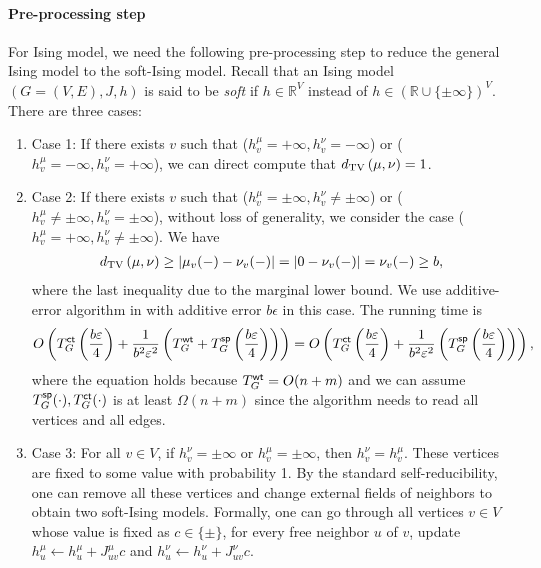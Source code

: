 \paragraph{Pre-processing step}
For Ising model, we need the following pre-processing step to reduce the general Ising model to the soft-Ising model.
Recall that an Ising model $(G=(V,E),J,h)$ is said to be \emph{soft} if $h \in \mathbb{R}^V$ instead of $h \in (\mathbb{R} \cup \{\pm \infty\})^V$. There are three cases: 
\begin{enumerate}
    \item Case 1: If there exists $v$ such that ($h_v^\mu =  +\infty,h_v^\nu = - \infty$)  or ($h_v^\mu = -\infty, h_v^\nu = +\infty$), we can direct compute that $d_{\mathrm{TV}}\left({\mu},{\nu}\right)=1$.
    \item Case 2: If there exists $v$ such that ($h_v^\mu =  \pm \infty,h_v^\nu \neq \pm \infty$) or ($h_v^\mu \neq \pm \infty, h_v^\nu = \pm \infty$), without loss of generality, we consider the case ($h_v^\mu =  +\infty,h_v^\nu \neq \pm \infty$). We have 
    \begin{align*}
        d_{\mathrm{TV}}\left({\mu},{\nu}\right)\geq |\mu_v(-)-\nu_v(-)|=|0-\nu_v(-)|=\nu_v(-) \geq b,
    \end{align*} 
    where the last inequality due to the marginal lower bound.
    We use additive-error algorithm in  with additive error $b\epsilon$ in this case. The running time is 
    \begin{align}\label{eq:time-pre}
        O\left(T^{\textsf{ct}}_G\left(\frac{b\varepsilon}{4}\right)+ \frac{1}{b^2\varepsilon^2}\left( T^{\textsf{wt}}_{G} + T^{\textsf{sp}}_G\left(\frac{b\varepsilon}{4}\right)\right)\right) =O\left(T^{\textsf{ct}}_G\left(\frac{b\varepsilon}{4}\right)+ \frac{1}{b^2\varepsilon^2}\left(T^{\textsf{sp}}_G\left(\frac{b\varepsilon}{4}\right)\right)\right),
    \end{align}
    where the equation holds because $T^{\textsf{wt}}_{G} = O(n+m)$ and we can assume $T^{\textsf{sp}}_G(\cdot),T^{\textsf{ct}}_G(\cdot)$ is at least $\Omega(n+m)$ since the algorithm needs to read all vertices and all edges.
    
    \item Case 3: For all $v\in V$, if $h_v^\nu=\pm \infty$ or $h_v^\mu=\pm \infty$, then $h_v^\nu=h_v^\mu$. These vertices are fixed to some value with probability 1. By the standard self-reducibility, one can remove all these vertices and change external fields of neighbors to obtain two soft-Ising models. Formally, one can go through all vertices $v \in V$ whose value is fixed as $c \in \{\pm\}$, for every free neighbor $u$ of $v$, update $h^\mu_u \gets h^\mu_u + J^\mu_{uv}c$ and $h^\nu_u \gets h^\nu_u + J^\nu_{uv}c$.


\end{enumerate}
